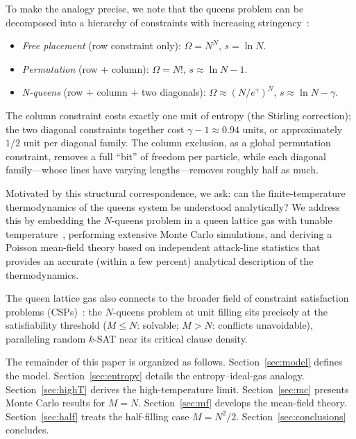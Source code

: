 \documentclass[aps, pre, reprint, amsmath, amssymb, superscriptaddress, floatfix]{revtex4-2}
\begin{document}
To make the analogy precise, we note that the queens problem can be
decomposed into a hierarchy of constraints with increasing
stringency~\cite{Knuth2022}:
\begin{itemize}
  \item \textit{Free placement} (row constraint only):
    $\Omega = N^N$, $s = \ln N$.
  \item \textit{Permutation} (row + column):
    $\Omega = N!$, $s \approx \ln N - 1$.
  \item \textit{N-queens} (row + column + two diagonals):
    $\Omega \approx (N/e^\gamma)^N$, $s \approx \ln N - \gamma$.
\end{itemize}
The column constraint costs exactly one unit of entropy (the
Stirling correction); the two diagonal constraints together cost
$\gamma - 1 \approx 0.94$ units, or approximately $1/2$ unit per
diagonal family.  The column exclusion, as a global
permutation constraint, removes a full ``bit'' of freedom per
particle, while each diagonal family---whose lines have varying
lengths---removes roughly half as much.

Motivated by this structural correspondence, we ask: can the
finite-temperature thermodynamics of the queens system be understood
analytically?  We address this by embedding the $N$-queens problem in
a queen lattice gas with tunable
temperature~\cite{Zhang2009,Polson2024}, performing extensive Monte
Carlo simulations, and deriving a Poisson mean-field theory based on
independent attack-line statistics that provides an accurate
(within a few percent) analytical description of the thermodynamics.

The queen lattice gas also connects to the broader field of
constraint satisfaction problems (CSPs)~\cite{Mezard2009,Krzakala2007}:
the $N$-queens problem at unit filling sits precisely at the
satisfiability threshold ($M \le N$: solvable; $M > N$: conflicts
unavoidable), paralleling random $k$-SAT near its critical clause
density.

The remainder of this paper is organized as follows.
Section~\ref{sec:model} defines the model.
Section~\ref{sec:entropy} details the entropy--ideal-gas analogy.
Section~\ref{sec:highT} derives the high-temperature limit.
Section~\ref{sec:mc} presents Monte Carlo results for $M = N$.
Section~\ref{sec:mf} develops the mean-field theory.
Section~\ref{sec:half} treats the half-filling case $M = N^2/2$.
Section~\ref{sec:conclusions} concludes.


\end{document}
